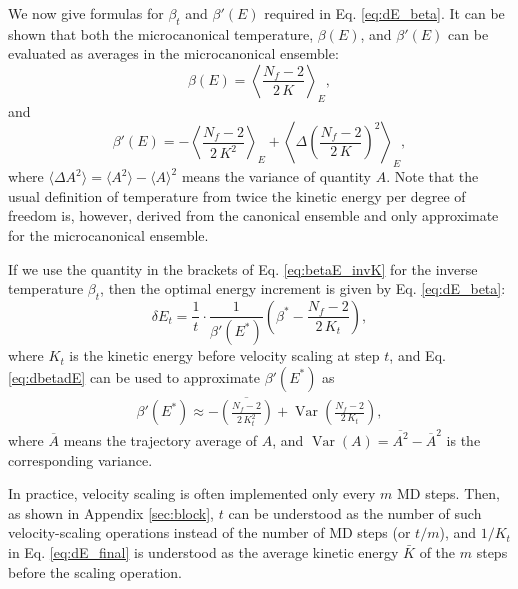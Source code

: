 \documentclass[reprint]{revtex4-1}
\begin{document}
We now give formulas for $\beta_t$
and $\beta'(E)$ required in Eq. \eqref{eq:dE_beta}.
%
It can be shown that both the microcanonical temperature, $\beta(E)$,
and $\beta'(E)$ can be evaluated as
averages in the microcanonical ensemble\cite{rugh1997, frenkel}:
%
\begin{equation}
  \beta(E)
  =
  \left\langle
    \frac{ N_f - 2 }
         { 2 \, K }
  \right\rangle_E
  ,
  \label{eq:betaE_invK}
\end{equation}
%
and
%
\begin{equation}
  \beta'(E)
  =
  - \left\langle
      \frac{ N_f - 2 }
           { 2 \, K^2 }
    \right\rangle_E
  + \left\langle
      \Delta\left(
        \frac{ N_f - 2 }
             { 2 \, K }
      \right)^2
    \right\rangle_E
  ,
  \label{eq:dbetadE}
\end{equation}
%
where
$\langle \Delta A^2 \rangle = \langle A^2 \rangle - \langle A \rangle^2$
means the variance of quantity $A$.
%
Note that the usual definition of temperature from twice the kinetic energy
per degree of freedom is, however,
derived from the canonical ensemble and
only approximate for the microcanonical ensemble.



If we use the quantity in the brackets of
Eq. \eqref{eq:betaE_invK} for the inverse temperature
$\beta_t$,
then the optimal energy increment is given by
Eq. \eqref{eq:dE_beta}:
%
\begin{equation}
\delta E_t
=
\frac{ 1 } { t } \cdot
\frac{ 1 } { \beta'(E^*) }
\left(
 \beta^* -
 \frac{ N_f - 2  }
      { 2 \, K_t }
\right)
,
\label{eq:dE_final}
\end{equation}
%
where
$K_t$ is the kinetic energy before velocity scaling at step $t$,
and
Eq. \eqref{eq:dbetadE} can be used to approximate
$\beta'(E^*)$ as
%
\begin{align}
  \beta'(E^*)
  \approx
  - \overline{
    \left(
      \frac{ N_f - 2 }
           { 2 \, K_t^2 }
    \right)
    }
    +
    \operatorname{Var}
    \left(
        \frac{ N_f - 2 }
             { 2 \, K_t }
    \right)
  ,
  \label{eq:dbeta}
\end{align}
%
where
$\overline A$ means the trajectory average of $A$,
and
$\operatorname{Var}(A) = \overline{ A^2 } - {\overline A}^2$
is the corresponding variance.

In practice, velocity scaling is often implemented
only every $m$ MD steps.
%
Then,
as shown in Appendix \ref{sec:block},
$t$ can be understood as the number of
such velocity-scaling operations instead of
the number of MD steps (or $t/m$), and
$1/K_t$ in Eq. \eqref{eq:dE_final} is understood
as the average kinetic energy $\bar K$ of the $m$ steps
before the scaling operation.
\end{document}
